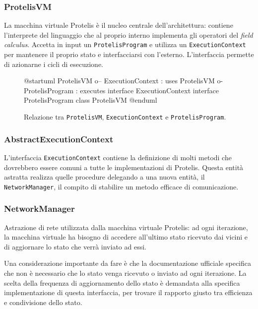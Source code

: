 \subsubsection{ProtelisVM}
La macchina virtuale Protelis è il nucleo centrale dell'architettura: contiene
l'interprete del linguaggio che al proprio interno implementa gli operatori del
\textit{field calculus}. Accetta in input un \texttt{ProtelisProgram} e utilizza un
\texttt{ExecutionContext} per mantenere il proprio stato e interfacciarsi con
l'esterno. L'interfaccia permette di azionarne i cicli di esecuzione.

\begin{figure}
  \centering
    \begin{plantuml}
      @startuml
      ProtelisVM o-- ExecutionContext : uses
      ProtelisVM o- ProtelisProgram : executes
      interface ExecutionContext
      interface ProtelisProgram
      class ProtelisVM
      @enduml
    \end{plantuml}
    \caption{Relazione tra \texttt{ProtelisVM}, \texttt{ExecutionContext} e
      \texttt{ProtelisProgram}.}
  \label{fig:uml-protelisvm}
\end{figure}

\subsubsection{AbstractExecutionContext}
L'interfaccia \texttt{ExecutionContext} contiene la definizione di molti metodi
che dovrebbero essere comuni a tutte le implementazioni di Protelis. Questa
entità astratta realizza quelle procedure delegando a una nuova entità, il
\texttt{NetworkManager}, il compito di stabilire un metodo efficace di
comunicazione.

\subsubsection{NetworkManager}
Astrazione di rete utilizzata dalla macchina virtuale Protelis: ad ogni
iterazione, la macchina virtuale ha bisogno di accedere all'ultimo stato ricevuto
dai vicini e di aggiornare lo stato che verrà inviato ad essi.

Una considerazione importante da fare è che la documentazione ufficiale
specifica che non è necessario che lo stato venga ricevuto o inviato ad ogni
iterazione. La scelta della frequenza di aggiornamento dello stato è demandata
alla specifica implementazione di questa interfaccia, per trovare il rapporto
giusto tra efficienza e condivisione dello stato.

